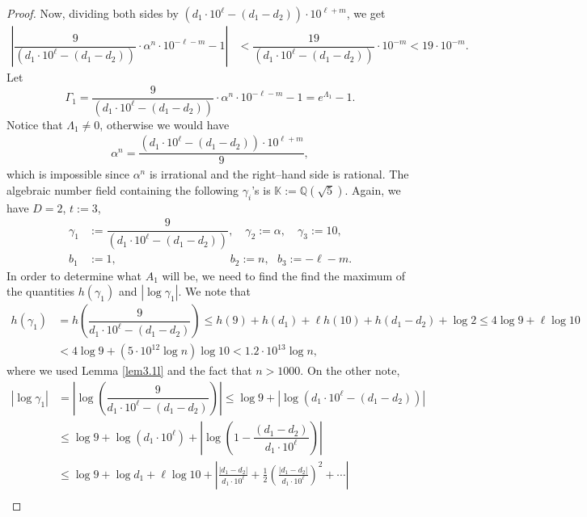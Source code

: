 \begin{proof}
Now, dividing both sides by $(d_1\cdot 10^{\ell}-(d_1-d_2))\cdot 10^{\ell+m}$, we get	
\begin{align}\label{eq3.3l}
	\left|\dfrac{9}{(d_1\cdot 10^{\ell}-(d_1-d_2))}\cdot\alpha^n\cdot 10^{-\ell-m}-1\right|
	&<\dfrac{19}{(d_1\cdot 10^{\ell}-(d_1-d_2))}\cdot 10^{-m}<19\cdot 10^{-m}.
\end{align}	
Let 
$$
\Gamma_1=\dfrac{9}{(d_1\cdot 10^{\ell}-(d_1-d_2))}\cdot\alpha^n\cdot 10^{-\ell-m}-1=e^{\Lambda_1}-1.
$$
Notice that $\Lambda_1\ne 0$, otherwise we would have
\begin{align*}
	\alpha^n=\dfrac{(d_1\cdot 10^{\ell}-(d_1-d_2))\cdot 10^{\ell+m}}{9},
\end{align*}
which is impossible since $	\alpha^n$ is irrational and the right--hand side is rational. The algebraic number field containing the following $\gamma_i$'s is $\mathbb{K} := \mathbb{Q}(\sqrt{5})$. Again, we have $D = 2$, $t :=3$,
\begin{equation}\nonumber
	\begin{aligned}
		\gamma_{1}&:=\dfrac{9}{(d_1\cdot 10^{\ell}-(d_1-d_2))},\quad\gamma_{2}:=\alpha,\quad\gamma_{3}:=10,\\
		b_{1}&:=1,\quad \quad\quad\quad\quad\quad\quad\quad\quad\quad b_{2}:=n,~~~ b_{3}:=-\ell-m.
	\end{aligned}
\end{equation}
In order to determine what $A_1$ will be, we need to find the find the maximum of the quantities $h(\gamma_{1} )$ and $|\log \gamma_1 |$. We note that
\begin{align*}
	h(\gamma_{1})&=h\left(\dfrac{9}{d_1\cdot 10^{\ell}-(d_1-d_2)}\right) \le h(9)+h(d_1)+\ell h(10)+h(d_1-d_2)+\log 2 \le 4\log 9+\ell \log 10\\
	&<4\log 9+(5\cdot 10^{12}\log n)\log 10<1.2\cdot 10^{13}\log n,
\end{align*}
where we used Lemma \ref{lem3.1l} and the fact that $n>1000$. On the other note,  
\begin{align*}
	|\log \gamma_1 |&=\left|\log\left(\dfrac{9}{d_1\cdot 10^{\ell}-(d_1-d_2)}\right)\right| \le \log 9+\left|\log (d_1\cdot 10^{\ell}-(d_1-d_2))\right|\\
	&\le  \log 9+\log \left(d_1\cdot 10^{\ell}\right)+\left|\log \left(1-\dfrac{(d_1-d_2)}{d_1\cdot 10^{\ell}}\right)\right|\\
	&\leq \log 9 + \log d_1+\ell \log 10   + \left| \frac{|d_1 - d_2|}{d_1 \cdot 10^\ell} + \frac{1}{2} \left( \frac{|d_1 - d_2|}{d_1 \cdot 10^\ell} \right)^2 + \cdots \right| \\

\end{align*}
\end{proof}
